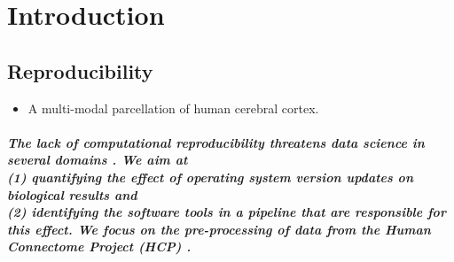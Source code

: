 \chapter{Introduction}
\section{Reproducibility}
\begin{itemize}
 \item A multi-modal parcellation of human cerebral cortex.
\end{itemize}
\paragraph{The lack of computational reproducibility threatens data science in several domains \cite{Gla15}.
We aim at 
\\ (1) quantifying the effect of operating system version updates on biological results and 
\\ (2) identifying the software tools in a pipeline that are responsible for this effect. 
We focus on the pre-processing of data from the Human Connectome Project (HCP) \cite{Gla13}.}
